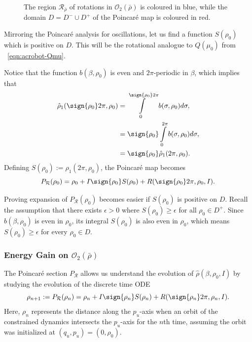\begin{figure}
    \centering
    
    \caption{The region \(\mathcal{R}_{\bar{\rho}}\) of rotations in
        \(\mathcal{O}_2(\bar{\rho})\) is coloured
        in blue, while the domain \(D = D^- \cup D^+\) of the Poincar\'{e} map 
        is coloured in red.}
    \label{fig:acrobot-rhobar-regions}
\end{figure}

Mirroring the Poincar\'{e} analysis for oscillations, let us find a
function \(S(\rho_0)\) which is positive on \(D\).
This will be the rotational analogue to \(Q(\mu_0)\) from
~\eqref{eqn:acrobot-Qmu}.

Notice that the function \(b(\beta,\rho_0)\) is even and
\(2\pi\)-periodic in \(\beta\), which implies that
\begin{align*}
    \hat{\rho}_1(\sign{\rho_0}2\pi, \rho_0) &=
    \int \limits_0^{\sign{\rho_0}2\pi} b(\sigma,\rho_0)d\sigma
    , \\
     &=\sign{\rho_0}\int\limits_0^{2\pi}b(\sigma,\rho_0)d\sigma
     , \\
     &= \sign{\rho_0} \hat{\rho}_1(2\pi,\rho_0)
     .
\end{align*}
Defining \(S(\rho_0) := \hat{\rho}_1(2\pi,\rho_0)\),
the Poincar\'{e} map becomes
\begin{equation}\label{eqn:acrobot-poincare-r}
    P_\mathcal{R}(\rho_0) = \rho_0 + I\sign{\rho_0}S(\rho_0) 
    + R(\sign{\rho_0}2\pi,\rho_0,I)
    .
\end{equation}

Proving expansion of \(P_\mathcal{R}(\rho_0)\) becomes easier if
\(S(\rho_0)\) is positive on \(D\).
Recall the assumption that there exists
\(\epsilon > 0\) where \(S(\rho_0) \geq \epsilon\) for all 
\(\rho_0 \in D^+\).
Since \(b(\beta,\rho_0)\) is even in \(\rho_0\),
its integral \(S(\rho_0)\) is also even in \(\rho_0\),
which means \(S(\rho_0) \geq \epsilon\) for every \(\rho_0 \in D\).

\subsubsection*{Energy Gain on \(\mathcal{O}_2(\bar{\rho})\)}
The Poincar\'{e} section \(P_\mathcal{R}\) allows us understand the evolution of
\(\hat{\rho}(\beta,\rho_0,I)\) by studying the evolution of the discrete time
ODE
\begin{equation}\label{eqn:rhohat-discrete}
    \rho_{n+1} := P_\mathcal{R}(\rho_n) 
    = \rho_n + I\sign{\rho_n}S(\rho_n) + 
        R(\sign{\rho_n}2\pi,\rho_n,I)
    .
\end{equation}
Here, \(\rho_n\) represents the distance along the
\(p_u\)-axis when an orbit of the constrained dynamics intersects the
\(p_u\)-axis for the \(n\)th time, assuming the orbit was initialized at
\((q_u,p_u) = (0,\rho_0)\).

